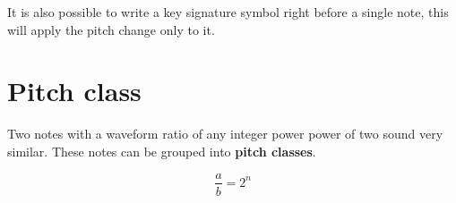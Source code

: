 \documentclass[a4paper]{article}
\begin{document}
\begin{center}
\end{center}

It is also possible to write a key signature symbol right before a single note, this will apply
the pitch change only to it.


\section{Pitch class}

Two notes with a waveform ratio of any integer power power of two
sound very similar. These notes can be grouped into \textbf{pitch classes}.

\[
    \frac{a}{b} = 2^n
\]
\end{document}
